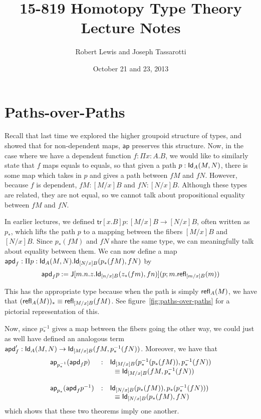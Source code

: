 \documentclass[12pt]{article}
\newcommand{\ap}{\mathsf{ap}}
\newcommand{\apd}{\mathsf{apd}}
\newcommand{\tr}{\mathsf{tr}}
\begin{document}
\title{15-819 Homotopy Type Theory Lecture Notes} 
\author{Robert Lewis and Joseph Tassarotti}
\date{October 21 and 23, 2013}

\maketitle

\section{Paths-over-Paths}\label{}

Recall that last time we explored the higher groupoid structure of types, and
showed that for non-dependent maps, $\ap$ preserves this structure.  Now, in
the case where we have a dependent function $f : \Pi x: A.B$, we would like to
similarly state that $f$ maps equals to equals, so that given a path $p :
\mathsf{Id}_{A}(M,N)$, there is some map which takes in $p$ and gives a path between $f
M$ and $f N$. However, because $f$ is dependent, $f M : [M/x]B$ and $f N :
[N/x] B$.  Although these types are related, they are not equal, so we cannot
talk about propositional equality between $f M$ and $f N$.

In earlier lectures, we defined $\tr[x.B]p : [M/x] B \to [N/x] B$, often
written as $p_*$, which lifts the path $p$ to a mapping between the fibers
$[M/x] B$ and $[N/x] B$. Since $p_*(f M)$ and $f N$ share the same type, we can
meaningfully talk about equality between them. We can now define a map $\apd_f
: \Pi p: \Id{A}(M, N). \Id{[N/x]B}(p_* (f M), f N)$ by
%
\[ \apd_f p := \J[m.n.z. \Id{[n/x]B}(z_{*}(f m), f n)](p ; m. \refl{[m/x]B}(m)) \]
%

This has the appropriate type because when the path is simply $\mathsf{refl}_{A}(M)$, we
have that $(\mathsf{refl}_{A}(M))_* \equiv \mathsf{refl}_{[M/x]B}(f M)$. See
figure~\ref{fig:paths-over-paths} for a pictorial representation of this. 

Now, since $p_*^{-1}$ gives a map between the fibers going the other way, we
could just as well have defined an analogous term $\apd_f' : \Id{A}(M, N) \to
\Id{[M/x]B}(f M, p_*^{-1}(f N))$. Moreover, we have that
%
\[
\begin{array}{lcl}
\ap_{p_*^{-1}} (\apd_f p) &:& \Id{[M/x]B}(p_*^{-1} (p_* (f M)), p_*^{-1} (f N))  \\
                          & &  \ \ \jdeq \Id{[M/x]B}(f M, p_*^{-1} (f N)) \\
\\
\ap_{p_*} (\apd_f p^{-1}) &:& \Id{[N/x]B}(p_* (f M)), p_* (p_*^{-1} (f N))) \\
                          & &  \ \ \jdeq \Id{[N/x]B}(p_* (f M), f N) \\

\end{array}
\]
%
which shows that these two theorems imply one another. 
\end{document}
